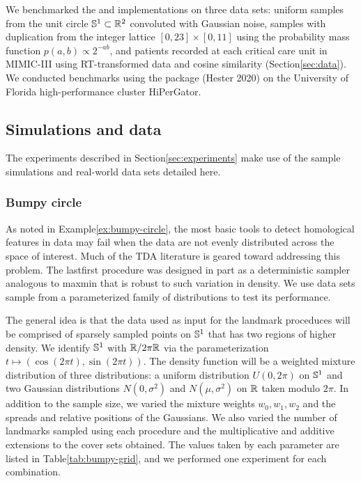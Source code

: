 \documentclass{article}
\begin{document}
We benchmarked the  and  implementations on three data
sets: uniform samples from the unit circle \(\mathbb{S}^1\subset\mathbb{R}^2\)
convoluted with Gaussian noise, samples with duplication from the
integer lattice \([0,23]\times[0,11]\) using the probability mass
function \(p(a,b) \propto 2^{-ab}\), and patients recorded at each
critical care unit in MIMIC-III using RT-transformed data and cosine
similarity (Section\nbs\ref{sec:data}). We conducted benchmarks using
the  package (Hester 2020) on the University of Florida
high-performance cluster HiPerGator.

\hypertarget{simulations-and-data}{%
\subsection{Simulations and data}\label{simulations-and-data}}

\label{sec:data}

The experiments described in Section\nbs\ref{sec:experiments} make use
of the sample simulations and real-world data sets detailed here.

\hypertarget{bumpy-circle}{%
\subsubsection{Bumpy circle}\label{bumpy-circle}}

As noted in Example\nbs\ref{ex:bumpy-circle}, the most basic tools to
detect homological features in data may fail when the data are not
evenly distributed across the space of interest. Much of the TDA
literature is geared toward addressing this problem. The lastfirst
procedure was designed in part as a deterministic sampler analogous to
maxmin that is robust to such variation in density. We use data sets
sample from a parameterized family of distributions to test its
performance.

The general idea is that the data used as input for the landmark
proceduces will be comprised of sparsely sampled points on \(\mathbb{S}^1\)
that has two regions of higher density. We identify \(\mathbb{S}^1\) with
\(\mathbb{R} / 2\pi\mathbb{R}\) via the parameterization
\(t \mapsto (\cos(2\pi t), \sin(2\pi t))\). The density function will be
a weighted mixture distribution of three distributions: a uniform
distribution \(U(0,2\pi)\) on \(\mathbb{S}^1\) and two Gaussian distributions
\(N(0,\sigma^2)\) and \(N(\mu,\sigma^2)\) on \(\mathbb{R}\) taken modulo
\(2\pi\). In addition to the sample size, we varied the mixture weights
\(w_0,w_1,w_2\) and the spreads and relative positions of the Gaussians.
We also varied the number of landmarks sampled using each procedure and
the multiplicative and additive extensions to the cover sets obtained.
The values taken by each parameter are listed in
Table\nbs\ref{tab:bumpy-grid}, and we performed one experiment for each
combination.
\end{document}
